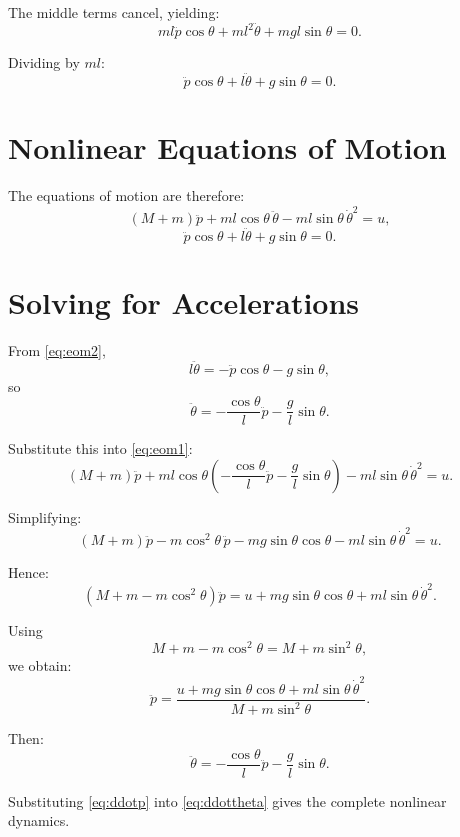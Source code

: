\documentclass[11pt,a4paper]{article}
\begin{document}
The middle terms cancel, yielding:
\[
ml\ddot p\cos\theta + ml^2\ddot\theta + mgl\sin\theta = 0.
\]

Dividing by \(ml\):
\[
\ddot p\cos\theta + l\ddot\theta + g\sin\theta = 0.
\]

\section{Nonlinear Equations of Motion}

The equations of motion are therefore:
\begin{equation}
(M+m)\ddot p + ml\cos\theta\,\ddot\theta - ml\sin\theta\,\dot\theta^2 = u,
\label{eq:eom1}
\end{equation}
\begin{equation}
\ddot p\cos\theta + l\ddot\theta + g\sin\theta = 0.
\label{eq:eom2}
\end{equation}

\section{Solving for Accelerations}

From \eqref{eq:eom2},
\[
l\ddot\theta = -\ddot p\cos\theta - g\sin\theta,
\]
so
\[
\ddot\theta = -\frac{\cos\theta}{l}\ddot p - \frac{g}{l}\sin\theta.
\]

Substitute this into \eqref{eq:eom1}:
\[
(M+m)\ddot p + ml\cos\theta
\left(
-\frac{\cos\theta}{l}\ddot p - \frac{g}{l}\sin\theta
\right)
- ml\sin\theta\,\dot\theta^2 = u.
\]

Simplifying:
\[
(M+m)\ddot p - m\cos^2\theta\,\ddot p - mg\sin\theta\cos\theta - ml\sin\theta\,\dot\theta^2 = u.
\]

Hence:
\[
\left(M + m - m\cos^2\theta\right)\ddot p
=
u + mg\sin\theta\cos\theta + ml\sin\theta\,\dot\theta^2.
\]

Using
\[
M + m - m\cos^2\theta = M + m\sin^2\theta,
\]
we obtain:
\begin{equation}
\ddot p =
\frac{
u + mg\sin\theta\cos\theta + ml\sin\theta\,\dot\theta^2
}{
M + m\sin^2\theta
}.
\label{eq:ddotp}
\end{equation}

Then:
\begin{equation}
\ddot\theta
=
-\frac{\cos\theta}{l}\ddot p - \frac{g}{l}\sin\theta.
\label{eq:ddottheta}
\end{equation}

Substituting \eqref{eq:ddotp} into \eqref{eq:ddottheta} gives the complete nonlinear dynamics.
\end{document}
